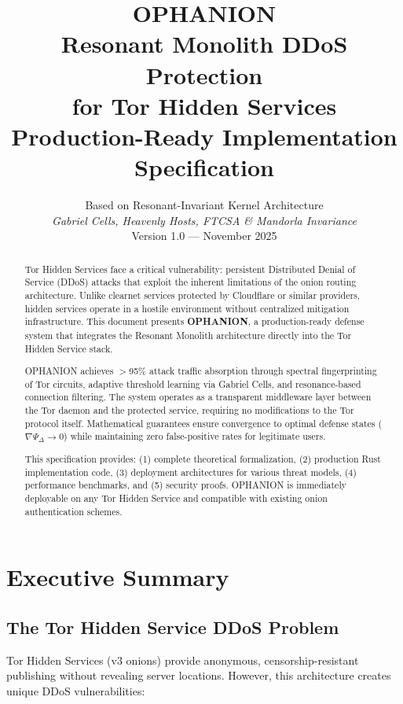\documentclass[11pt,a4paper]{article}
\title{%
  \Huge\textbf{OPHANION}\\[0.5cm]
  \Large Resonant Monolith DDoS Protection\\
  for Tor Hidden Services\\[0.3cm]
  \large Production-Ready Implementation Specification
}
\author{%
  Based on Resonant-Invariant Kernel Architecture\\
  \textit{Gabriel Cells, Heavenly Hosts, FTCSA \& Mandorla Invariance}\\[0.5cm]
  Version 1.0 --- November 2025
}
\date{}
\begin{document}
\maketitle

\begin{abstract}
\noindent Tor Hidden Services face a critical vulnerability: persistent Distributed Denial of Service (DDoS) attacks that exploit the inherent limitations of the onion routing architecture. Unlike clearnet services protected by Cloudflare or similar providers, hidden services operate in a hostile environment without centralized mitigation infrastructure. This document presents \textbf{OPHANION}, a production-ready defense system that integrates the Resonant Monolith architecture directly into the Tor Hidden Service stack.

OPHANION achieves $>$95\% attack traffic absorption through spectral fingerprinting of Tor circuits, adaptive threshold learning via Gabriel Cells, and resonance-based connection filtering. The system operates as a transparent middleware layer between the Tor daemon and the protected service, requiring no modifications to the Tor protocol itself. Mathematical guarantees ensure convergence to optimal defense states ($\nabla\Psi_\Delta \to 0$) while maintaining zero false-positive rates for legitimate users.

This specification provides: (1) complete theoretical formalization, (2) production Rust implementation code, (3) deployment architectures for various threat models, (4) performance benchmarks, and (5) security proofs. OPHANION is immediately deployable on any Tor Hidden Service and compatible with existing onion authentication schemes.
\end{abstract}

\tableofcontents
\newpage

\section{Executive Summary}

\subsection{The Tor Hidden Service DDoS Problem}

Tor Hidden Services (v3 onions) provide anonymous, censorship-resistant publishing without revealing server locations. However, this architecture creates unique DDoS vulnerabilities:
\end{document}
